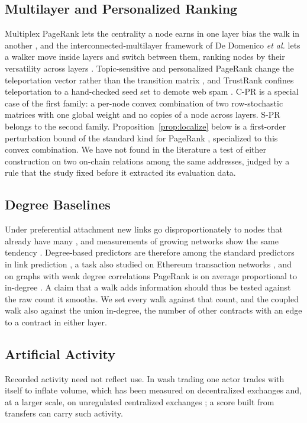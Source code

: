 \documentclass{ieeeaccess}
\newcommand{\cpr}{\mbox{C-PR}}
\newcommand{\spr}{\mbox{S-PR}}
\begin{document}
\subsection{Multilayer and Personalized Ranking}
Multiplex PageRank lets the centrality a node earns in one layer bias the walk in another \cite{halu2013multiplex}, and the interconnected-multilayer framework of De Domenico \emph{et al.} lets a walker move inside layers and switch between them, ranking nodes by their versatility across layers \cite{dedomenico2015ranking}. Topic-sensitive and personalized PageRank change the teleportation vector rather than the transition matrix \cite{haveliwala2003topic,jeh2003personalized}, and TrustRank confines teleportation to a hand-checked seed set to demote web spam \cite{gyongyi2004trustrank}. \cpr{} is a special case of the first family: a per-node convex combination of two row-stochastic matrices with one global weight and no copies of a node across layers. \spr{} belongs to the second family. Proposition~\ref{prop:localize} below is a first-order perturbation bound of the standard kind for PageRank \cite{langville2006pagerank}, specialized to this convex combination. We have not found in the literature a test of either construction on two on-chain relations among the same addresses, judged by a rule that the study fixed before it extracted its evaluation data.

\subsection{Degree Baselines}
Under preferential attachment new links go disproportionately to nodes that already have many \cite{barabasi1999scaling}, and measurements of growing networks show the same tendency \cite{newman2001clustering}. Degree-based predictors are therefore among the standard predictors in link prediction \cite{libennowell2007link}, a task also studied on Ethereum transaction networks \cite{lin2022tracking}, and on graphs with weak degree correlations PageRank is on average proportional to in-degree \cite{fortunato2008indegree}. A claim that a walk adds information should thus be tested against the raw count it smooths. We set every walk against that count, and the coupled walk also against the union in-degree, the number of other contracts with an edge to a contract in either layer.

\subsection{Artificial Activity}
Recorded activity need not reflect use. In wash trading one actor trades with itself to inflate volume, which has been measured on decentralized exchanges \cite{victor2021washtrading} and, at a larger scale, on unregulated centralized exchanges \cite{cong2023washtrading}; a score built from transfers can carry such activity.
\end{document}
